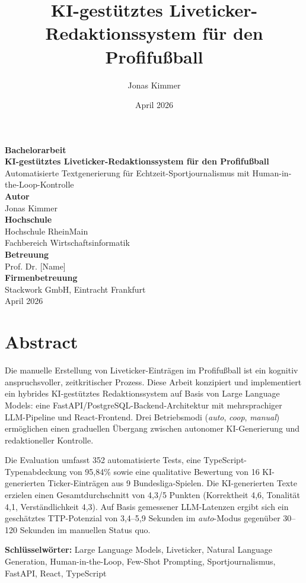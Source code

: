 \documentclass[12pt,a4paper,ngerman]{report}
\title{KI-gestütztes Liveticker-Redaktionssystem für den Profifußball}
\author{Jonas Kimmer}
\date{April 2026}
\begin{document}
\begin{titlepage}
\centering
\vspace*{3cm}
{\Large \textbf{Bachelorarbeit}}\\[2cm]
{\LARGE \textbf{KI-gestütztes Liveticker-Redaktionssystem für den Profifußball}}\\[0.5cm]
{\large Automatisierte Textgenerierung für Echtzeit-Sportjournalismus mit Human-in-the-Loop-Kontrolle}\\[3cm]
{\large \textbf{Autor}}\\
Jonas Kimmer\\[3cm]
{\large \textbf{Hochschule}}\\
Hochschule RheinMain\\[0.5cm]
Fachbereich Wirtschaftsinformatik\\[3cm]
{\large \textbf{Betreuung}}\\
Prof. Dr. [Name]\\[3cm]
{\large \textbf{Firmenbetreuung}}\\
Stackwork GmbH, Eintracht Frankfurt\\[3cm]
{\large April 2026}
\end{titlepage}

\chapter*{Abstract}

Die manuelle Erstellung von Liveticker-Einträgen im Profifußball ist ein kognitiv anspruchsvoller, zeitkritischer Prozess. Diese Arbeit konzipiert und implementiert ein hybrides KI-gestütztes Redaktionssystem auf Basis von Large Language Models: eine FastAPI/PostgreSQL-Backend-Architektur mit mehrsprachiger LLM-Pipeline und React-Frontend. Drei Betriebsmodi (\textit{auto}, \textit{coop}, \textit{manual}) ermöglichen einen graduellen Übergang zwischen autonomer KI-Generierung und redaktioneller Kontrolle.

Die Evaluation umfasst 352 automatisierte Tests, eine TypeScript-Typenabdeckung von 95,84\% sowie eine qualitative Bewertung von 16 KI-generierten Ticker-Einträgen aus 9 Bundesliga-Spielen. Die KI-generierten Texte erzielen einen Gesamtdurchschnitt von 4,3/5 Punkten (Korrektheit 4,6, Tonalität 4,1, Verständlichkeit 4,3). Auf Basis gemessener LLM-Latenzen ergibt sich ein geschätztes TTP-Potenzial von 3,4--5,9 Sekunden im \textit{auto}-Modus gegenüber 30--120 Sekunden im manuellen Status quo.

\noindent\textbf{Schlüsselwörter:} Large Language Models, Liveticker, Natural Language Generation, Human-in-the-Loop, Few-Shot Prompting, Sportjournalismus, FastAPI, React, TypeScript

\tableofcontents









\end{document}

